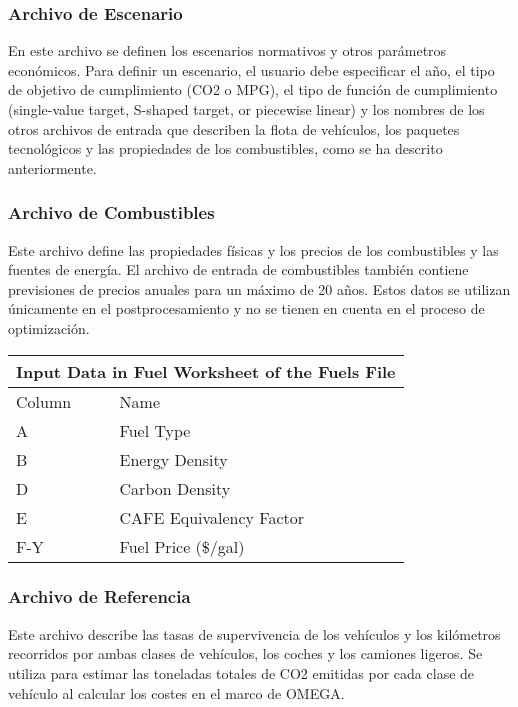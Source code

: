 \subsubsection{Archivo de Escenario}

En este archivo se definen los escenarios normativos y otros parámetros económicos. Para definir un escenario, el usuario debe especificar el año, el tipo de objetivo de cumplimiento (CO2 o MPG), el tipo de función de cumplimiento (single-value target, S-shaped target, or piecewise linear) y los nombres de los otros archivos de entrada que describen la flota de vehículos, los paquetes tecnológicos y las propiedades de los combustibles, como se ha descrito anteriormente.

\subsubsection{Archivo de Combustibles}

Este archivo define las propiedades físicas y los precios de los combustibles y las fuentes de energía. El archivo de entrada de combustibles también contiene previsiones de precios anuales para un máximo de 20 años. Estos datos se utilizan únicamente en el postprocesamiento y no se tienen en cuenta en el proceso de optimización.

\begin{center}
\begin{tabular}{ |p{2cm}||p{6cm}|}
 \hline
 \multicolumn{2}{|c|}{Input Data in Fuel Worksheet of the Fuels File} \\
 \hline
 Column & Name\\
 \hline
    A & Fuel Type \\
    B & Energy Density \\
    D & Carbon Density  \\
    E & CAFE Equivalency Factor \\
    F-Y & Fuel Price (\$/gal) \\
 \hline
\end{tabular}
\end{center}

\subsubsection{Archivo de Referencia}

Este archivo describe las tasas de supervivencia de los vehículos y los kilómetros recorridos por ambas clases de vehículos, los coches y los camiones ligeros. Se utiliza para estimar las toneladas totales de CO2 emitidas por cada clase de vehículo al calcular los costes en el marco de OMEGA.

